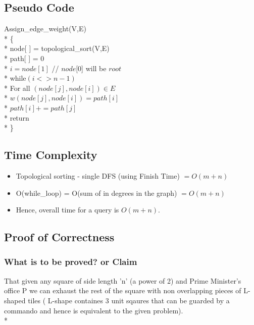 \documentclass{article}
\begin{document}
\subsection{Pseudo Code}
Assign\_edge\_weight(V,E)	\\*
\{			\\*
	\hspace*{1cm}node[ ] = topological\_sort(V,E) \\*
	\hspace*{1cm}path[ ] = $0$ \\*
	\hspace*{1cm} $i = node[1]$ // $node[0$] will be $root$\\*
	\hspace*{1cm} while$(i <> n-1)$  \\*
	\hspace*{2cm} For all $(node[j], node[i]) \in E$ \\*
	\hspace*{3cm} $w(node[j], node[i]) = path[i]$ \\*
	\hspace*{3cm} $path[i] += path[j]$ \\*
	\hspace*{1cm}return \\*
\}
\subsection{Time Complexity}
\begin{itemize}
\item Topological sorting - single DFS (using Finish Time) $= O(m+n)$
\item O(while\_loop) = O(sum of in degrees in the graph) $= O(m+n)$
\item Hence, overall time for a query is $O(m+n)$. 
\end{itemize}
\subsection{Proof of Correctness}
\subsubsection{What is to be proved? or Claim}
That given any square of side length 'n' (a power of 2)  and Prime Minister's office P we can exhaust the rest of the square with non overlapping pieces of L-shaped tiles ( L-shape containes 3 unit sqaures that can be guarded by a commando and hence is equivalent to the given problem).  \\*
\end{document}
